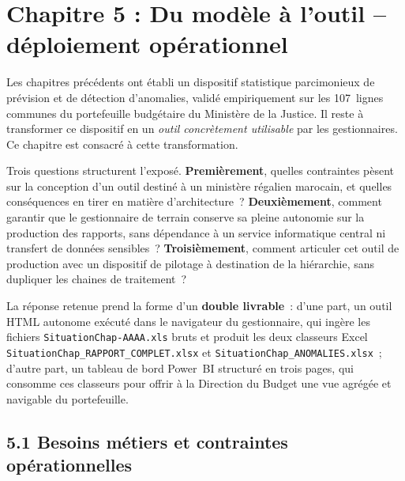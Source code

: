 \section*{Chapitre 5 : Du mod\`ele \`a l'outil -- d\'eploiement op\'erationnel}

\bigskip

Les chapitres pr\'ec\'edents ont \'etabli un dispositif statistique
parcimonieux de pr\'evision et de d\'etection d'anomalies, valid\'e
empiriquement sur les 107~lignes communes du portefeuille budg\'etaire du
Minist\`ere de la Justice. Il reste \`a transformer ce dispositif en un
\emph{outil concr\`etement utilisable} par les gestionnaires. Ce chapitre
est consacr\'e \`a cette transformation.

Trois questions structurent l'expos\'e. \textbf{Premi\`erement}, quelles
contraintes p\`esent sur la conception d'un outil destin\'e \`a un
minist\`ere r\'egalien marocain, et quelles cons\'equences en tirer en
mati\`ere d'architecture~? \textbf{Deuxi\`emement}, comment garantir que le
gestionnaire de terrain conserve sa pleine autonomie sur la production des
rapports, sans d\'ependance \`a un service informatique central ni transfert
de donn\'ees sensibles~? \textbf{Troisi\`emement}, comment articuler cet
outil de production avec un dispositif de pilotage \`a destination de la
hi\'erarchie, sans dupliquer les chaines de traitement~?

La r\'eponse retenue prend la forme d'un \textbf{double livrable}~: d'une
part, un outil HTML autonome ex\'ecut\'e dans le navigateur du gestionnaire,
qui ing\`ere les fichiers \texttt{SituationChap-AAAA.xls} bruts et produit
les deux classeurs Excel \texttt{SituationChap\_RAPPORT\_COMPLET.xlsx} et
\texttt{SituationChap\_ANOMALIES.xlsx}~; d'autre part, un tableau de bord
Power~BI structur\'e en trois pages, qui consomme ces classeurs pour offrir
\`a la Direction du Budget une vue agr\'eg\'ee et navigable du portefeuille.

\subsection*{5.1 \quad Besoins m\'etiers et contraintes op\'erationnelles}

